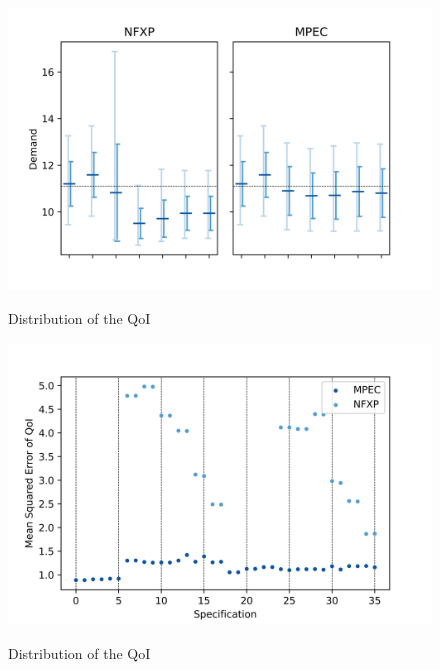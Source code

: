 \begin{figure}[H]
	\caption{Distribution of the QoI}
	\vspace*{-4mm}
	\centering
	\includegraphics[scale=0.9]{../figures/figure_9.png}
	\label{figure9}
\end{figure}

\begin{figure}[H]
	\caption{Distribution of the QoI}
	\vspace*{-4mm}
	\centering
	\includegraphics[scale=0.9]{../figures/figure_10.png}
	\label{figure10}
\end{figure}


